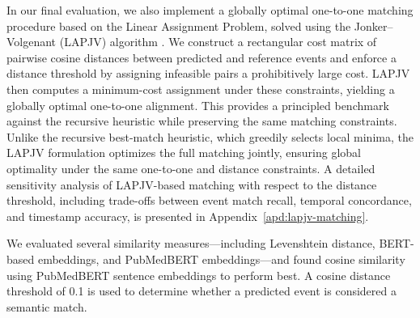 In our final evaluation, we also implement a globally optimal one-to-one matching procedure based on the Linear Assignment Problem, solved using the Jonker–Volgenant (LAPJV) algorithm \citep{jonker1987shortest}. We construct a rectangular cost matrix of pairwise cosine distances between predicted and reference events and enforce a distance threshold by assigning infeasible pairs a prohibitively large cost. LAPJV then computes a minimum-cost assignment under these constraints, yielding a globally optimal one-to-one alignment. This provides a principled benchmark against the recursive heuristic while preserving the same matching constraints. Unlike the recursive best-match heuristic, which greedily selects local minima, the LAPJV formulation optimizes the full matching jointly, ensuring global optimality under the same one-to-one and distance constraints. A detailed sensitivity analysis of LAPJV-based matching with respect to the distance threshold,
including trade-offs between event match recall, temporal concordance, and timestamp accuracy, is presented in Appendix~\ref{apd:lapjv-matching}. 

We evaluated several similarity measures—including Levenshtein distance, BERT-based
embeddings, and PubMedBERT embeddings—and found cosine similarity using PubMedBERT
sentence embeddings to perform best. A cosine distance threshold of 0.1 is used to determine
whether a predicted event is considered a semantic match.






